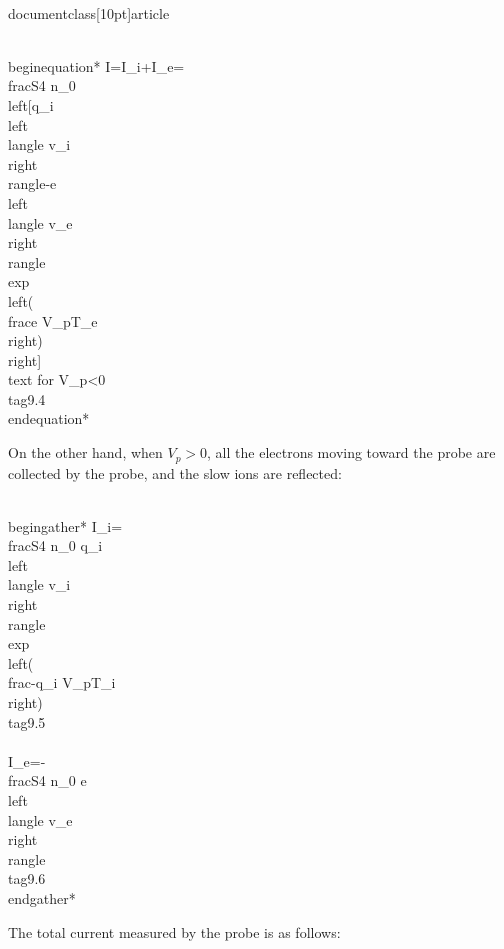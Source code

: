\\documentclass[10pt]{article}
\begin{document}
{{{{{\\begin{equation*}
I=I_{i}+I_{e}=\\frac{S}{4} n_{0}\\left[q_{i}\\left\\langle v_{i}\\right\\rangle-e\\left\\langle v_{e}\\right\\rangle \\exp \\left(\\frac{e V_{p}}{T_{e}}\\right)\\right] \\text { for } V_{p}<0 \\tag{9.4}
\\end{equation*}


On the other hand, when $V_{p}>0$, all the electrons moving toward the probe are collected by the probe, and the slow ions are reflected:


\\begin{gather*}
I_{i}=\\frac{S}{4} n_{0} q_{i}\\left\\langle v_{i}\\right\\rangle \\exp \\left(\\frac{-q_{i} V_{p}}{T_{i}}\\right)  \\tag{9.5}\\\\
I_{e}=-\\frac{S}{4} n_{0} e\\left\\langle v_{e}\\right\\rangle \\tag{9.6}
\\end{gather*}


The total current measured by the probe is as follows:


}}}}}
\end{document}

